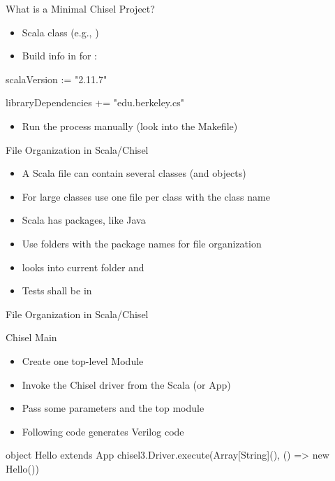 \begin{frame}[fragile]{What is a Minimal Chisel Project?}
\begin{itemize}
\item Scala class (e.g., )
\item Build info in  for :
\end{itemize}
\begin{chisel}
scalaVersion := "2.11.7"

libraryDependencies += "edu.berkeley.cs" %
\end{chisel}
\begin{itemize}
\item Run the process manually (look into the Makefile)
\end{itemize}
\end{frame}

\begin{frame}[fragile]{File Organization in Scala/Chisel}
\begin{itemize}
\item A Scala file can contain several classes (and objects)
\item For large classes use one file per class with the class name
\item Scala has packages, like Java
\item Use folders with the package names for file organization
\item {} looks into current folder and 
\item Tests shall be in 
\end{itemize}
\end{frame}

\begin{frame}[fragile]{File Organization in Scala/Chisel}
\end{frame}

\begin{frame}[fragile]{Chisel Main}

\begin{itemize}
\item Create one top-level Module
\item Invoke the Chisel driver from the Scala  (or App)
\item Pass some parameters and the top module
\item Following code generates Verilog code
\end{itemize}
\begin{chisel}
object Hello extends App {
  chisel3.Driver.execute(Array[String](), () => new Hello())
}
\end{chisel}
\end{frame}

